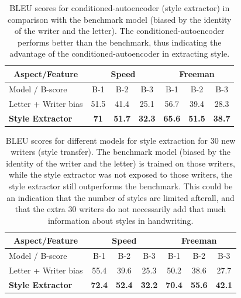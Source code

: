   \begin{table}[!htbp]
  \centering
  \begin{tabular}{l|c c c|c c c}
  \hline
  \multicolumn{1}{c|}{Aspect/Feature} & \multicolumn{3}{c|}{ Speed } & \multicolumn{3}{c}{ Freeman }   \\ \hline
  Model / B-score      & B-1  & B-2  & B-3           & B-1  & B-2   & B-3              \\ \hline
  Letter + Writer bias & 51.5 & 41.4 & 25.1          & 56.7 & 39.4  & 28.3             \\\hline
  \textbf{Style Extractor} & \textbf{71} & \textbf{51.7} & \textbf{32.3} & \textbf{65.6} & \textbf{51.5} & \textbf{38.7} \\\hline
  \end{tabular}
  \caption{BLEU scores for conditioned-autoencoder (style extractor) in comparison with the benchmark model (biased by the identity of the writer and the letter). The conditioned-autoencoder performs better than the benchmark, thus indicating the advantage of the conditioned-autoencoder in extracting style.}
  \label{table:bleu_gen}
  \end{table}

  \begin{table}[!htbp]
  \centering
  \begin{tabular}{l|c c c|c c c}
  \hline
  \multicolumn{1}{c|}{Aspect/Feature} & \multicolumn{3}{c|}{ Speed } & \multicolumn{3}{c}{ Freeman }   \\ \hline
  Model / B-score      & B-1  & B-2  & B-3           & B-1  & B-2   & B-3              \\ \hline
  Letter + Writer bias & 55.4 & 39.6 & 25.3 & 50.2 & 38.6 & 27.7             \\\hline
  \textbf{Style Extractor} & \textbf{72.4} & \textbf{52.4} & \textbf{32.2} & \textbf{70.4} & \textbf{55.6} & \textbf{42.1} \\\hline

  \end{tabular}
  \caption{BLEU scores for different models for style extraction for 30 new writers (style transfer). The benchmark model (biased by the identity of the writer and the letter) is trained on those writers, while the style extractor was not exposed to those writers, the style extractor still outperforms the benchmark. This could be an indication that the number of styles are limited afterall, and that the extra 30 writers do not necessarily add that much information about styles in handwriting.}
  \label{table:bleu_transfer}
  \end{table}

